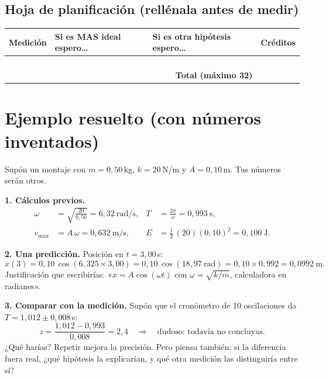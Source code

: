\documentclass[11pt,a4paper]{article}
\begin{document}
\subsection*{Hoja de planificación (rellénala antes de medir)}
\begin{center}
\renewcommand{\arraystretch}{1.6}
\begin{tabularx}{\textwidth}{|p{3.3cm}|X|X|c|}
\hline
\textbf{Medición} & \textbf{Si es MAS ideal espero…} & \textbf{Si es otra hipótesis espero…} & \textbf{Créditos} \\ \hline
 & & & \\ \hline
 & & & \\ \hline
 & & & \\ \hline
 & & & \\ \hline
\multicolumn{3}{|r|}{\textbf{Total (máximo 32)}} & \\ \hline
\end{tabularx}
\end{center}

\section{Ejemplo resuelto (con números inventados)}

Supón un montaje con $m = 0{,}50$\,kg, $k = 20$\,N/m y $A = 0{,}10$\,m. Tus números serán otros.

\textbf{1. Cálculos previos.}
\begin{align*}
\omega &= \sqrt{\frac{20}{0{,}50}} = 6{,}32\ \text{rad/s}, & T &= \frac{2\pi}{\omega} = 0{,}993\ \text{s},\\
v_{\max} &= A\,\omega = 0{,}632\ \text{m/s}, & E &= \tfrac12\,(20)(0{,}10)^2 = 0{,}100\ \text{J}.
\end{align*}

\textbf{2. Una predicción.} Posición en $t = 3{,}00$\,s:
\[
x(3) = 0{,}10\,\cos(6{,}325\times 3{,}00) = 0{,}10\,\cos(18{,}97\ \text{rad}) = 0{,}10\times 0{,}992 = 0{,}0992\ \text{m}.
\]
Justificación que escribirías: «$x = A\cos(\omega t)$ con $\omega=\sqrt{k/m}$, calculadora en radianes».

\textbf{3. Comparar con la medición.} Supón que el cronómetro de 10 oscilaciones da $T = 1{,}012 \pm 0{,}008$\,s:
\[
z = \frac{1{,}012 - 0{,}993}{0{,}008} = 2{,}4 \quad\Rightarrow\quad \text{dudoso: todavía no concluyas.}
\]
¿Qué harías? Repetir mejora la precisión. Pero piensa también: si la diferencia fuera real, ¿qué hipótesis la explicarían, y qué otra medición las distinguiría entre sí?
\end{document}
